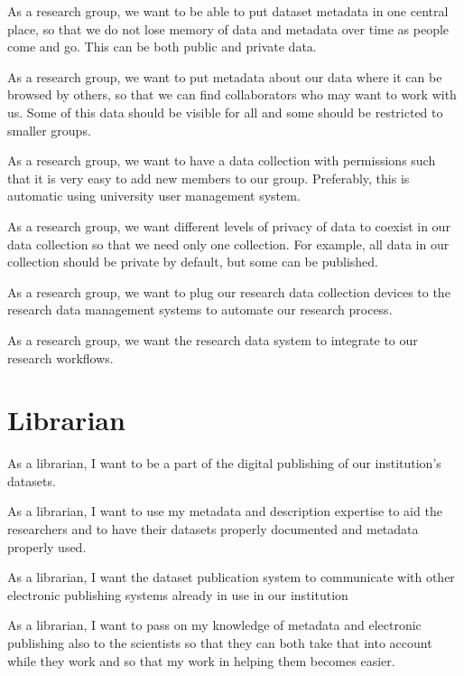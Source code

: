 \begin{compactitem}
    \item As a research group, we want to be able to put dataset metadata
          in one central place, so that we do not lose memory of data and
          metadata over time as people come and go. This can be both public
          and private data.
    \item As a research group, we want to put metadata about our data where it
          can be browsed by others, so that we can find collaborators
          who may want to work with us. Some of this data should be visible
          for all and some should be restricted to smaller groups.
    \item As a research group, we want to have a data collection with
          permissions such that it is very easy to add new members to our
          group. Preferably, this is automatic using university user management system.
    \item As a research group, we want different levels of privacy of data to
          coexist in our data collection so that we need only one collection.
          For example, all data in our collection should be private by default,
          but some can be published.
    \item As a research group, we want to plug our research data collection devices
          to the research data management systems to automate our research process.
    \item As a research group, we want the research data system to integrate to our
          research workflows.
\end{compactitem}

\section{Librarian}

\begin{compactitem}
    \item As a librarian, I want to be a part of the digital publishing of our
          institution's datasets.
    \item As a librarian, I want to use my metadata and description expertise
          to aid the researchers and to have their datasets properly documented
          and metadata properly used.
    \item As a librarian, I want the dataset publication system to communicate
          with other electronic publishing systems already in use in our
          institution
    \item As a librarian, I want to pass on my knowledge of metadata and
          electronic publishing also to the scientists so that they can both
          take that into account while they work and so that my work in helping
          them becomes easier.
\end{compactitem}

